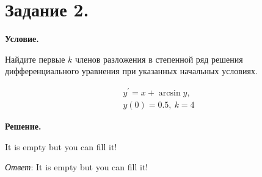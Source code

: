\section{Задание 2.}

\textbf{Условие.}

Найдите первые $k$ членов разложения в степенной ряд решения дифференциального уравнения при указанных 
начальных условиях. 

\begin{gather*}
    y^\prime = x + \arcsin y, \\
    y(0) = 0.5, \ k = 4
\end{gather*}

\vspace{10mm}

\textbf{Решение.}

It is empty but you can fill it!

\textit{Ответ}:  It is empty but you can fill it!

\clearpage
